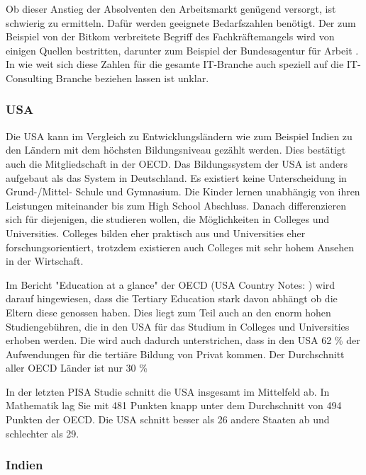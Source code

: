 Ob dieser Anstieg der Absolventen den Arbeitsmarkt genügend versorgt, ist schwierig zu ermitteln. Dafür werden geeignete Bedarfszahlen benötigt. Der zum Beispiel von der Bitkom verbreitete Begriff \cite{fachkraft} des Fachkräftemangels wird von einigen Quellen bestritten, darunter zum Beispiel der Bundesagentur für Arbeit \cite{fachkraftnein}. In wie weit sich diese Zahlen für die gesamte IT-Branche auch speziell auf die IT-Consulting Branche beziehen lassen ist unklar.

\subsubsection*{USA}
Die USA kann im Vergleich zu Entwicklungsländern wie zum Beispiel Indien zu den Ländern mit dem höchsten Bildungsniveau gezählt werden. Dies bestätigt auch die Mitgliedschaft in der OECD. Das Bildungssystem der USA ist anders aufgebaut als das System in Deutschland. Es existiert keine Unterscheidung in Grund-/Mittel- Schule und Gymnasium. Die Kinder lernen unabhängig von ihren Leistungen miteinander bis zum High School Abschluss. Danach differenzieren sich für diejenigen, die studieren wollen, die Möglichkeiten in Colleges und Universities. Colleges bilden eher praktisch aus und Universities eher forschungsorientiert, trotzdem existieren auch Colleges mit sehr hohem Ansehen in der Wirtschaft. 

Im Bericht "Education at a glance" der OECD (USA Country Notes: \cite{oecd4}) wird darauf hingewiesen, dass die Tertiary Education stark davon abhängt ob die Eltern diese genossen haben. Dies liegt zum Teil auch an den enorm hohen Studiengebühren, die in den USA für das Studium in Colleges und Universities erhoben werden. Die wird auch dadurch unterstrichen, dass in den USA 62 \% der Aufwendungen für die tertiäre Bildung von Privat kommen. Der Durchschnitt aller OECD Länder ist nur 30 \%

In der letzten PISA Studie schnitt die USA insgesamt im Mittelfeld ab. In Mathematik lag Sie mit 481 Punkten knapp unter dem Durchschnitt von 494 Punkten der OECD. Die USA schnitt besser als 26 andere Staaten ab und schlechter als 29. \cite{pisa2}

\subsubsection*{Indien}

